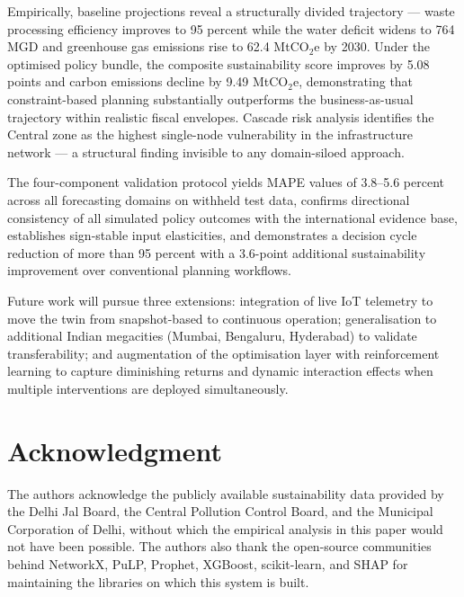 \documentclass[conference]{IEEEtran}
\begin{document}
Empirically, baseline projections reveal a structurally divided
trajectory --- waste processing efficiency improves to 95 percent while
the water deficit widens to 764 MGD and greenhouse gas emissions rise to
62.4 MtCO$_2$e by 2030. Under the optimised policy bundle, the composite
sustainability score improves by 5.08 points and carbon emissions decline
by 9.49 MtCO$_2$e, demonstrating that constraint-based planning
substantially outperforms the business-as-usual trajectory within
realistic fiscal envelopes. Cascade risk analysis identifies the Central
zone as the highest single-node vulnerability in the infrastructure
network --- a structural finding invisible to any domain-siloed
approach.

The four-component validation protocol yields MAPE values of 3.8--5.6
percent across all forecasting domains on withheld test data, confirms
directional consistency of all simulated policy outcomes with the
international evidence base, establishes sign-stable input elasticities,
and demonstrates a decision cycle reduction of more than 95 percent with
a 3.6-point additional sustainability improvement over conventional
planning workflows.

Future work will pursue three extensions: integration of live IoT
telemetry to move the twin from snapshot-based to continuous operation;
generalisation to additional Indian megacities (Mumbai, Bengaluru,
Hyderabad) to validate transferability; and augmentation of the
optimisation layer with reinforcement learning to capture diminishing
returns and dynamic interaction effects when multiple interventions are
deployed simultaneously.

\section*{Acknowledgment}

The authors acknowledge the publicly available sustainability data
provided by the Delhi Jal Board, the Central Pollution Control Board,
and the Municipal Corporation of Delhi, without which the empirical
analysis in this paper would not have been possible. The authors also
thank the open-source communities behind NetworkX, PuLP, Prophet,
XGBoost, scikit-learn, and SHAP for maintaining the libraries on which
this system is built.
\end{document}
